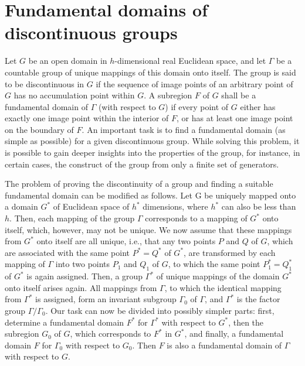 \documentclass[10pt]{amsart}
\begin{document}
\section{Fundamental domains of discontinuous groups}

Let $G$ be an open domain in $h$-dimensional real Euclidean space, and let $\Gamma$ be a
countable group of unique mappings of this domain onto itself. The group is said
to be discontinuous in $G$ if the sequence of image points of an arbitrary point of $G$
has no accumulation point within $G$. A subregion $F$ of $G$ shall be a fundamental
domain of $\Gamma$ (with respect to $G$) if every point of $G$ either has exactly one image
point within the interior of $F$, or has at least one image point on the boundary
of $F$. An important task is to find a fundamental domain (as simple as possible)
for a given discontinuous group. While solving this problem, it is possible to gain
deeper insights into the properties of the group, for instance, in certain cases, the
construct of the group from only a finite set of generators.

The problem of proving the discontinuity of a group and finding a suitable fundamental
domain can be modified as follows. Let G be uniquely mapped onto a domain $G^*$ of Euclidean
space of $h^*$ dimensions, where $h^*$ can also be less than $h$.
Then, each mapping of the group $\Gamma$ corresponds to a mapping of $G^*$ onto itself,
which, however, may not be unique. We now assume that these mappings from
$G^*$ onto itself are all unique, i.e., that any two points $P$ and $Q$ of $G$, which are
associated with the same point $P^* = Q^*$ of $G^*$, are transformed by each mapping of
$\Gamma$ into two points $P_1$ and $Q_1$ of $G$, to which the same point $P_1^* = Q_1^*$
of $G^*$ is again assigned. Then, a group $\Gamma^*$ of unique mappings of the domain
$G^*$ onto itself arises again. All mappings from $\Gamma$, to which the identical mapping
from $\Gamma^*$ is assigned, form an invariant subgroup $\Gamma_0$ of $\Gamma$, and $\Gamma^*$
is the factor group $\Gamma / \Gamma_0$. Our task can now be divided into possibly simpler
parts: first, determine a fundamental domain $F^*$ for $\Gamma^*$ with respect to $G^*$,
then the subregion $G_0$ of $G$, which corresponds to $F^*$ in $G^*$, and finally, a
fundamental domain $F$ for $\Gamma_0$ with respect to $G_0$. Then $F$
is also a fundamental domain of $\Gamma$ with respect to $G$.
\end{document}

